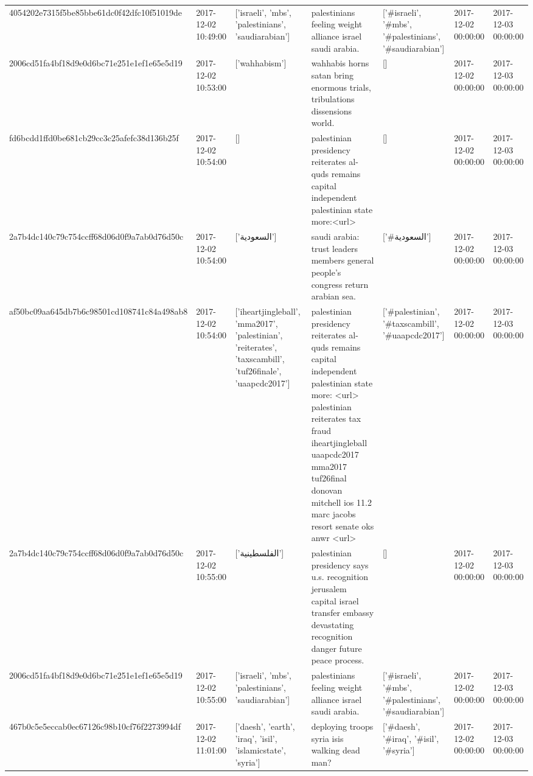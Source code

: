 \begin{tabular}{lllllll}
4054202e7315f5be85bbe61dc0f42dfc10f51019de & 2017-12-02 10:49:00 & ['israeli', 'mbs', 'palestinians', 'saudiarabian'] & palestinians feeling weight alliance israel saudi arabia. & ['#israeli', '#mbs', '#palestinians', '#saudiarabian'] & 2017-12-02 00:00:00 & 2017-12-03 00:00:00 \\
2006cd51fa4bf18d9e0d6bc71e251e1ef1e65e5d19 & 2017-12-02 10:53:00 & ['wahhabism'] & wahhabis horns satan bring enormous trials, tribulations dissensions world. & [] & 2017-12-02 00:00:00 & 2017-12-03 00:00:00 \\
fd6bcdd1ffd0be681cb29cc3c25afefc38d136b25f & 2017-12-02 10:54:00 & [] & palestinian presidency reiterates al-quds remains capital independent palestinian state more:<url> & [] & 2017-12-02 00:00:00 & 2017-12-03 00:00:00 \\
2a7b4dc140c79c754ccff68d06d0f9a7ab0d76d50c & 2017-12-02 10:54:00 & ['السعودية'] & saudi arabia: trust leaders members general people's congress return arabian sea. & ['#السعودية'] & 2017-12-02 00:00:00 & 2017-12-03 00:00:00 \\
af50bc09aa645db7b6c98501cd108741c84a498ab8 & 2017-12-02 10:54:00 & ['iheartjingleball', 'mma2017', 'palestinian', 'reiterates', 'taxscambill', 'tuf26finale', 'uaapcdc2017'] & palestinian presidency reiterates al-quds remains capital independent palestinian state more: <url> palestinian reiterates tax fraud iheartjingleball uaapcdc2017 mma2017 tuf26final donovan mitchell ios 11.2 marc jacobs resort senate oks anwr <url> & ['#palestinian', '#taxscambill', '#uaapcdc2017'] & 2017-12-02 00:00:00 & 2017-12-03 00:00:00 \\
2a7b4dc140c79c754ccff68d06d0f9a7ab0d76d50c & 2017-12-02 10:55:00 & ['الفلسطينية'] & palestinian presidency says u.s. recognition jerusalem capital israel transfer embassy devastating recognition danger future peace process. & [] & 2017-12-02 00:00:00 & 2017-12-03 00:00:00 \\
2006cd51fa4bf18d9e0d6bc71e251e1ef1e65e5d19 & 2017-12-02 10:55:00 & ['israeli', 'mbs', 'palestinians', 'saudiarabian'] & palestinians feeling weight alliance israel saudi arabia. & ['#israeli', '#mbs', '#palestinians', '#saudiarabian'] & 2017-12-02 00:00:00 & 2017-12-03 00:00:00 \\
467b0c5e5eccab0ec67126c98b10cf76f2273994df & 2017-12-02 11:01:00 & ['daesh', 'earth', 'iraq', 'isil', 'islamicstate', 'syria'] & deploying troops syria isis walking dead man? & ['#daesh', '#iraq', '#isil', '#syria'] & 2017-12-02 00:00:00 & 2017-12-03 00:00:00 \\

\end{tabular}
